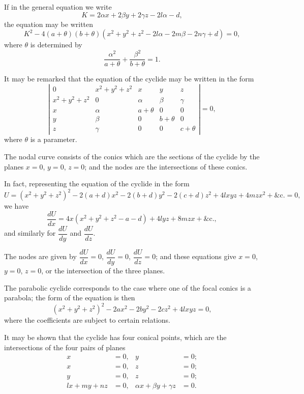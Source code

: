 \documentclass[11pt,a4paper]{article}
\theoremstyle{plain}
\theoremstyle{definition}
\theoremstyle{remark}
\begin{document}
\newpage

If in the general equation we write
\[
K = 2\alpha x + 2\beta y + 2\gamma z - 2l\alpha - d,
\]
the equation may be written
\[
K^2 - 4(a + \theta)(b + \theta)(x^2 + y^2 + z^2 - 2l\alpha - 2m\beta - 2n\gamma + d) = 0,
\]
where $\theta$ is determined by
\[
\frac{\alpha^2}{a + \theta} + \frac{\beta^2}{b + \theta} = 1.
\]

It may be remarked that the equation of the cyclide may be written in the form
\[
\left| \begin{array}{ccccc}
0 & x^2 + y^2 + z^2 & x & y & z \\
x^2 + y^2 + z^2 & 0 & \alpha & \beta & \gamma \\
x & \alpha & a + \theta & 0 & 0 \\
y & \beta & 0 & b + \theta & 0 \\
z & \gamma & 0 & 0 & c + \theta
\end{array} \right| = 0,
\]
where $\theta$ is a parameter.

The nodal curve consists of the conics which are the sections of the cyclide by the planes $x = 0$, $y = 0$, $z = 0$; and the nodes are the intersections of these conics.

\newpage

In fact, representing the equation of the cyclide in the form
\[
U = (x^2 + y^2 + z^2)^2 - 2(a + d)x^2 - 2(b + d)y^2 - 2(c + d)z^2 + 4lxyz + 4mzx^2 + \&\text{c.} = 0,
\]
we have
\[
\frac{dU}{dx} = 4x(x^2 + y^2 + z^2 - a - d) + 4lyz + 8mzx + \&\text{c.},
\]
and similarly for $\dfrac{dU}{dy}$ and $\dfrac{dU}{dz}$.

The nodes are given by $\dfrac{dU}{dx} = 0$, $\dfrac{dU}{dy} = 0$, $\dfrac{dU}{dz} = 0$; and these equations give $x = 0$, $y = 0$, $z = 0$, or the intersection of the three planes.

The parabolic cyclide corresponds to the case where one of the focal conics is a parabola; the form of the equation is then
\[
(x^2 + y^2 + z^2)^2 - 2ax^2 - 2by^2 - 2cz^2 + 4lxyz = 0,
\]
where the coefficients are subject to certain relations.

\newpage

It may be shown that the cyclide has four conical points, which are the intersections of the four pairs of planes
\begin{align*}
x &= 0, & y &= 0; \\
x &= 0, & z &= 0; \\
y &= 0, & z &= 0; \\
lx + my + nz &= 0, & \alpha x + \beta y + \gamma z &= 0.
\end{align*}
\end{document}
